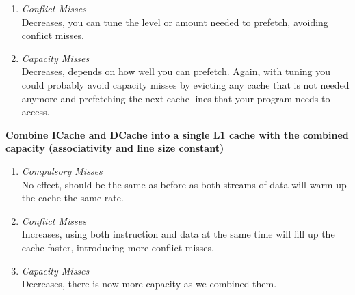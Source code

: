 \documentclass[11pt]{article}
\begin{document}
\begin{Parts}
\begin{enumerate}[i]
		\item \textit{Conflict Misses} \\
		      Decreases, you can tune the level or amount needed to prefetch, avoiding conflict misses.
		\item \textit{Capacity Misses} \\
		      Decreases, depends on how well you can prefetch. Again, with tuning you could probably avoid capacity misses by evicting any cache that is not needed anymore and prefetching the next cache lines that your program needs to access.
	\end{enumerate}
	\Part \textbf{Combine ICache and DCache into a single L1 cache with the combined capacity (associativity and line size constant)} \\
	\begin{enumerate}[i]
		\item \textit{Compulsory Misses} \\
		      No effect, should be the same as before as both streams of data will warm up the cache the same rate.
		\item \textit{Conflict Misses} \\
		      Increases, using both instruction and data at the same time will fill up the cache faster, introducing more conflict misses.
		\item \textit{Capacity Misses} \\
		      Decreases, there is now more capacity as we combined them.
	\end{enumerate}
\end{Parts}

\newpage
\end{document}
